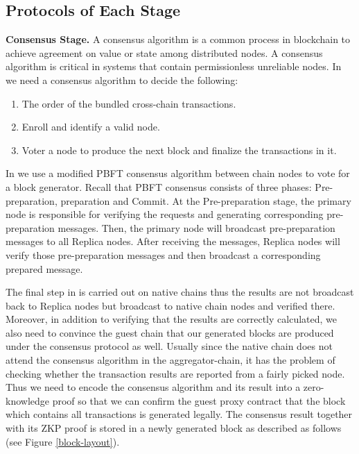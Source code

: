 \subsection{Protocols of Each Stage}
\textbf{Consensus Stage.}
\label{consensus-stage}
A consensus algorithm is a common process in blockchain to achieve agreement on value or state among distributed nodes. A consensus algorithm is critical in systems that contain permissionless unreliable nodes. In \dprotocol we need a consensus algorithm to decide the following:

\begin{enumerate}[leftmargin=*]
\item The order of the bundled cross-chain transactions.
\item Enroll and identify a valid node.
\item Voter a node to produce the next block and finalize the transactions in it. 
\end{enumerate}

In \dprotocol we use a modified PBFT \cite{castro1999practical} consensus algorithm between chain nodes to vote for a block generator. Recall that PBFT consensus consists of three phases: Pre-preparation, preparation and Commit. At the Pre-preparation stage, the primary node is responsible for verifying the requests and generating corresponding pre-preparation messages. Then, the primary node will broadcast pre-preparation messages to all Replica nodes. After receiving the messages, Replica nodes will verify those pre-preparation messages and then broadcast a corresponding prepared message.

The final step in \dprotocol is carried out on native chains thus the results are not broadcast back to Replica nodes but broadcast to native chain nodes and verified there. Moreover, in addition to verifying that the results are correctly calculated, we also need to convince the guest chain that our generated blocks are produced under the consensus protocol as well. Usually since the native chain does not attend the consensus algorithm in the aggregator-chain, it has the problem of checking whether the transaction results are reported from a fairly picked node. Thus we need to encode the consensus algorithm and its result into a zero-knowledge proof so that we can confirm the guest proxy contract that the block which contains all transactions is generated legally. The consensus result together with its ZKP proof is stored in a newly generated block as described as follows (see Figure \ref{block-layout}). 

